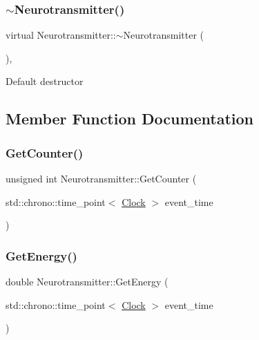 \subsubsection{\texorpdfstring{$\sim$\+Neurotransmitter()}{~Neurotransmitter()}}
{\footnotesize\ttfamily virtual Neurotransmitter\+::$\sim$\+Neurotransmitter (\begin{DoxyParamCaption}{ }\end{DoxyParamCaption})\hspace{0.3cm}{\ttfamily [inline]}, {\ttfamily [virtual]}}

Default destructor 

\subsection{Member Function Documentation}
\mbox{\label{classNeurotransmitter_a94b3d1909cdd787f0583e28e1e9b58dd}} 
\subsubsection{\texorpdfstring{Get\+Counter()}{GetCounter()}}
{\footnotesize\ttfamily unsigned int Neurotransmitter\+::\+Get\+Counter (\begin{DoxyParamCaption}\item[{std\+::chrono\+::time\+\_\+point$<$ \mbox{\hyperlink{universe_8h_a0ef8d951d1ca5ab3cfaf7ab4c7a6fd80}{Clock}} $>$}]{event\+\_\+time }\end{DoxyParamCaption})\hspace{0.3cm}{\ttfamily [inline]}}

\mbox{\label{classNeurotransmitter_a1e3e8134ea935f617b0afd2f7b5b5799}} 
\subsubsection{\texorpdfstring{Get\+Energy()}{GetEnergy()}}
{\footnotesize\ttfamily double Neurotransmitter\+::\+Get\+Energy (\begin{DoxyParamCaption}\item[{std\+::chrono\+::time\+\_\+point$<$ \mbox{\hyperlink{universe_8h_a0ef8d951d1ca5ab3cfaf7ab4c7a6fd80}{Clock}} $>$}]{event\+\_\+time }\end{DoxyParamCaption})\hspace{0.3cm}{\ttfamily [inline]}}


